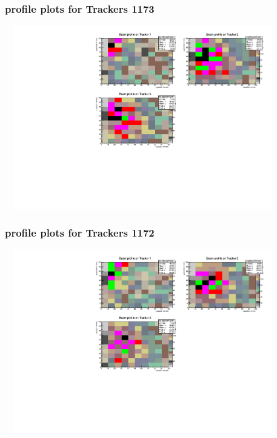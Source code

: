 \documentclass[slidestop,compress,mathserif]{beamer}
\begin{document}
\begin{frame}\frametitle{profile plots for Trackers 1173}
	 \includegraphics[width=12cm,height=8cm]{profile_plots_for_Trackers_1173.pdf}
\end{frame}
\begin{frame}\frametitle{profile plots for Trackers 1172}
	 \includegraphics[width=12cm,height=8cm]{profile_plots_for_Trackers_1172.pdf}
\end{frame}
\end{document}
